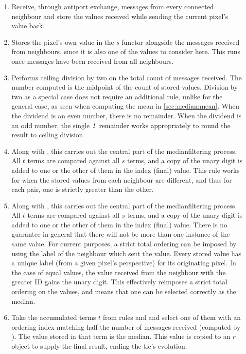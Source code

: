 \begin{enumerate}
    \item Receive, through antiport exchange, messages from every connected neighbour and store the values received while sending the current pixel's value back.
    \item Stores the pixel's own value in the \(s\) \gls{functor} alongside the messages received from neighbours, since it is also one of the values to consider here.  This runs once messages have been received from all neighbours.
    \item Performs ceiling division by two on the total count of messages received.  The number computed is the midpoint of the count of stored values.  Division by two as a special case does not require an additional rule, unlike for the general case, as seen when computing the mean in \vref{sec:median:mean}.  When the dividend is an even number, there is no remainder.  When the dividend is an odd number, the single \(\mathit{1}\) remainder works appropriately to round the result to ceiling division.
    \item Along with , this carries out the central part of the \gls{medianfilter}ing process.  All \(t\) terms are compared against all \(s\) terms, and a copy of the unary digit is added to one or the other of them in the index (final) value.  This rule works for when the stored values from each neighbour are different, and thus for each pair, one is strictly greater than the other.
    \item Along with , this carries out the central part of the \gls{medianfilter}ing process.  All \(t\) terms are compared against all \(s\) terms, and a copy of the unary digit is added to one or the other of them in the index (final) value.  There is no guarantee in general that there will not be more than one instance of the same value.  For current purposes, a strict total ordering can be imposed by using the label of the neighbour which sent the value.  Every stored value has a unique label (from a given pixel's perspective) for its originating pixel.  In the case of equal values, the value received from the neighbour with the greater ID gains the unary digit.  This effectively reimposes a strict total ordering on the values, and means that one can be selected correctly as the median.
    \item Take the accumulated terms \(t\) from rules  and  and select one of them with an ordering index matching half the number of messages received (computed by ).  The value stored in that term is the median.  This value is copied to an \(r\) object to supply the final result, ending the \gls{tlc}'s evolution.
\end{enumerate}

